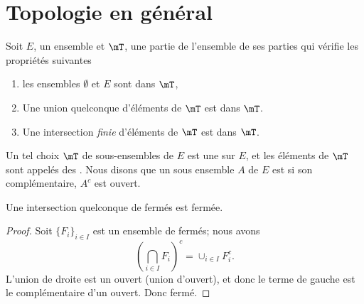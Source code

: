 
					\section{Topologie en général}

\begin{definition}		\label{DefTopologieGene}
Soit $E$, un ensemble et $\mT$, une partie de l'ensemble de ses parties qui vérifie les propriétés suivantes
\begin{enumerate}

\item
les ensembles $\emptyset$ et $E$ sont dans $\mT$,

\item
    Une union quelconque d'éléments de \( \mT\) est dans \( \mT\).
\item
    Une intersection \emph{finie} d'éléments de \( \mT\) est dans \( \mT\).

\end{enumerate}
Un tel choix $\mT$ de sous-ensembles de $E$ est une   sur $E$, et les éléments de $\mT$ sont appelés des . Nous disons que un sous ensemble $A$ de $E$ est  si son complémentaire, $A^c$ est ouvert.
\end{definition}

\begin{lemma}   \label{LemQYUJwPC}
    Une intersection quelconque de fermés est fermée.
\end{lemma}

\begin{proof}
    Soit \( \{ F_i \}_{i\in I} \) est un ensemble de fermés; nous avons
    \begin{equation}
        \left( \bigcap_{i\in I}F_i \right)^c=\cup_{i\in I}F_i^c.
    \end{equation}
    L'union de droite est un ouvert (union d'ouvert), et donc le terme de gauche est le complémentaire d'un ouvert. Donc fermé.
\end{proof}

